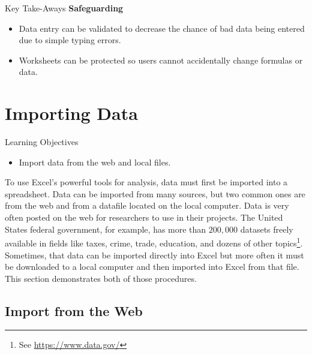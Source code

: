 \begin{center}
	\begin{tkwbox}{Key Take-Aways}
		\textbf{Safeguarding}
		\\
		\begin{itemize}
			\setlength{\itemsep}{0pt}
			\setlength{\parskip}{0pt}
			\setlength{\parsep}{0pt}
			
			\item Data entry can be validated to decrease the chance of bad data being entered due to simple typing errors.
			\item Worksheets can be protected so users cannot accidentally change formulas or data.
			
		\end{itemize}
	\end{tkwbox}
\end{center}

\section{Importing Data}

\begin{center}
	\begin{objbox}{Learning Objectives}
		\begin{itemize}
			\setlength{\itemsep}{0pt}
			\setlength{\parskip}{0pt}
			\setlength{\parsep}{0pt}
			
			\item Import data from the web and local files.

		\end{itemize}
	\end{objbox}
\end{center}

To use Excel's powerful tools for analysis, data must first be imported into a spreadsheet. Data can be imported from many sources, but two common ones are from the web and from a datafile located on the local computer. Data is very often posted on the web for researchers to use in their projects. The United States federal government, for example, has more than $ 200,000 $ datasets freely available in fields like taxes, crime, trade, education, and dozens of other topics\footnote{See \url{https://www.data.gov/}}. Sometimes, that data can be imported directly into Excel but more often it must be downloaded to a local computer and then imported into Excel from that file. This section demonstrates both of those procedures.

\subsection{Import from the Web}

